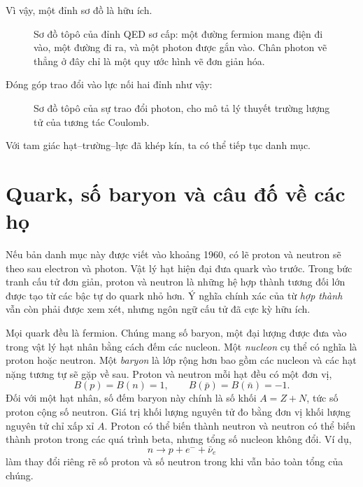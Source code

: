 Vì vậy, một đỉnh sơ đồ là hữu ích.

\begin{figure}[h]
\centering
{}
\caption{Sơ đồ tôpô của đỉnh QED sơ cấp: một đường fermion mang điện đi vào, một đường đi ra, và một photon được gắn vào. Chân photon vẽ thẳng ở đây chỉ là một quy ước hình vẽ đơn giản hóa.}
\end{figure}

Đóng góp trao đổi vào lực nối hai đỉnh như vậy:

\begin{figure}[h]
\centering
{}
\caption{Sơ đồ tôpô của sự trao đổi photon, cho mô tả lý thuyết trường lượng tử của tương tác Coulomb.}
\end{figure}

Với tam giác hạt--trường--lực đã khép kín, ta có thể tiếp tục danh mục.

\section{Quark, số baryon và câu đố về các họ}

Nếu bản danh mục này được viết vào khoảng 1960, có lẽ proton và neutron sẽ theo sau electron và photon. Vật lý hạt hiện đại đưa quark vào trước. Trong bức tranh cấu tử đơn giản, proton và neutron là những hệ hợp thành tương đối lớn được tạo từ các bậc tự do quark nhỏ hơn. Ý nghĩa chính xác của từ \emph{hợp thành} vẫn còn phải được xem xét, nhưng ngôn ngữ cấu tử đã cực kỳ hữu ích.

Mọi quark đều là fermion. Chúng mang số baryon, một đại lượng được đưa vào trong vật lý hạt nhân bằng cách đếm các nucleon. Một \emph{nucleon} cụ thể có nghĩa là proton hoặc neutron. Một \emph{baryon} là lớp rộng hơn bao gồm các nucleon và các hạt nặng tương tự sẽ gặp về sau. Proton và neutron mỗi hạt đều có một đơn vị,
\begin{equation}
B(p)=B(n)=1,
\qquad
B(\bar p)=B(\bar n)=-1.
\end{equation}
Đối với một hạt nhân, số đếm baryon này chính là số khối \(A=Z+N\), tức số proton cộng số neutron. Giá trị khối lượng nguyên tử đo bằng đơn vị khối lượng nguyên tử chỉ xấp xỉ \(A\). Proton có thể biến thành neutron và neutron có thể biến thành proton trong các quá trình beta, nhưng tổng số nucleon không đổi. Ví dụ,
\begin{equation}
n\longrightarrow p+e^-+\bar\nu_e
\end{equation}
làm thay đổi riêng rẽ số proton và số neutron trong khi vẫn bảo toàn tổng của chúng.

